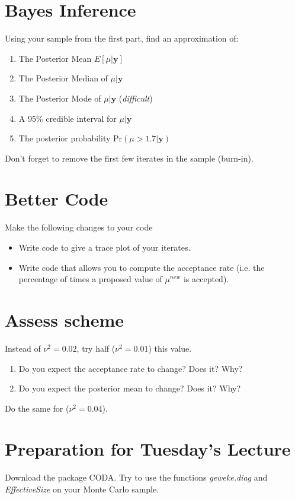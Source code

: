 \documentclass{article}
\begin{document}
\section*{Bayes Inference}
Using your sample from the first part, find an approximation of: 
\begin{enumerate}
\item The Posterior Mean $E[\mu|{\bm y}]$
\item The Posterior Median of $\mu|{\bm y}$
\item The Posterior Mode of $\mu|{\bm y}$ ({\em difficult})
\item A 95\% credible interval for $\mu|{\bm y}$
\item The posterior probability $\mbox{Pr}(\mu>1.7|{\bm y})$
\end{enumerate}
Don't forget to remove the first few iterates in the sample (burn-in).
\section*{Better Code}
Make the following changes to your code
\begin{itemize}
\item Write code to give a trace plot of your iterates. 
\item Write code that allows you to compute the acceptance rate (i.e. the percentage of times a proposed value of $\mu^{new}$ is accepted).
\end{itemize}
\section*{Assess scheme}
Instead of $\nu^2=0.02$, try half ($\nu^2=0.01$) this value. 
\begin{enumerate}
\item Do you expect the acceptance rate to change? Does it? Why? 
\item Do you expect the posterior mean to change? Does it? Why? 
\end{enumerate}
Do the same for ($\nu^2=0.04$).  
\section*{Preparation for Tuesday's Lecture}
Download the package CODA.  Try to use the functions {\em geweke.diag} and {\em EffectiveSize} on your Monte Carlo sample.
\end{document}
